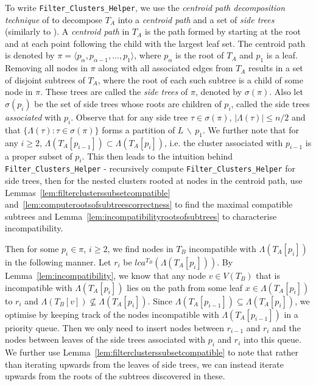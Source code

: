 \documentclass{article}
\newcommand{\leafset}{\Lambda}
\begin{document}
    To write \texttt{Filter\_Clusters\_Helper}, we use the \textit{centroid path decomposition technique} of \cite{cole2000n} to decompose $T_A$ into a \textit{centroid path} and a set of \textit{side trees} (similarly to \cite{jansson2018algorithms}). A \textit{centroid path} in $T_A$ is the path formed by starting at the root and at each point following the child with the largest leaf set. The centroid path is denoted by $\pi = \langle p_{\alpha}, p_{\alpha - 1}, ..., p_1 \rangle$, where $p_{\alpha}$ is the root of $T_A$ and $p_1$ is a leaf. Removing all nodes in $\pi$ along with all associated edges from $T_A$ results in a set of disjoint subtrees of $T_A$, where the root of each such subtree is a child of some node in $\pi$. These trees are called the \textit{side trees} of $\pi$, denoted by $\sigma(\pi)$. Also let $\sigma(p_i)$ be the set of side trees whose roots are children of $p_i$, called the side trees \textit{associated} with $p_i$. Observe that for any side tree $\tau \in \sigma(\pi)$, $|\leafset(\tau)| \leq n/2$ and that $\{\leafset(\tau) : \tau \in \sigma(\pi)\}$ forms a partition of $L\, \backslash\, {p_1}$. We further note that for any $i \geq 2$, $\leafset(T_A[p_{i - 1}]) \subset \leafset(T_A[p_i])$, i.e. the cluster associated with $p_{i-1}$ is a proper subset of $p_i$. This then leads to the intuition behind \texttt{Filter\_Clusters\_Helper} - recursively compute \texttt{Filter\_Clusters\_Helper} for side trees, then for the nested clusters rooted at nodes in the centroid path, use Lemmas~\ref{lem:filterclusterssubsetcompatible} and~\ref{lem:computerootsofsubtreescorrectness} to find the maximal compatible subtrees and Lemma~\ref{lem:incompatibilityrootsofsubtrees} to characterise incompatibility.

    Then for some $p_i \in \pi$, $i \geq 2$, we find nodes in $T_B$ incompatible with $\leafset(T_A[p_i])$ in the following manner. Let $r_i$ be $lca^{T_B}(\leafset(T_A[p_i]))$. By Lemma~\ref{lem:incompatibility}, we know that any node $v \in V(T_B)$ that is incompatible with $\leafset(T_A[p_i])$ lies on the path from some leaf $x \in \leafset(T_A[p_i])$ to $r_i$ and $\leafset(T_B[v]) \not\subseteq \leafset(T_A[p_i])$. Since $\leafset(T_A[p_{i-1}]) \subseteq \leafset(T_A[p_i])$, we optimise by keeping track of the nodes incompatible with $\leafset(T_A[p_{i-1}])$ in a priority queue. Then we only need to insert nodes between $r_{i-1}$ and $r_i$ and the nodes between leaves of the side trees associated with $p_i$ and $r_i$ into this queue. We further use Lemma~\ref{lem:filterclusterssubsetcompatible} to note that rather than iterating upwards from the leaves of side trees, we can instead iterate upwards from the roots of the subtrees discovered in these.
\end{document}
